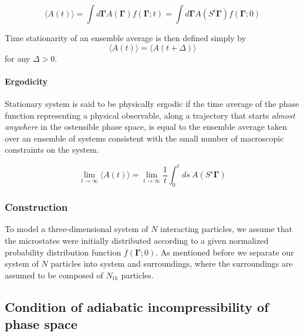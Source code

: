 \documentclass[a4paper,12pt,nofootinbib]{article}
\begin{document}
\begin{equation}
  \langle A(t) \rangle = \int d\bm{\Gamma} A(\bm{\Gamma}) f(\bm{\Gamma};t) = \int d\bm{\Gamma} A(S^t\bm{\Gamma})f(\bm{\Gamma};0)
\end{equation}

Time stationarity of an ensemble average is then defined simply by
\begin{equation}
\label{StationaryStateDef}
    \langle A(t) \rangle =   \langle A(t+\Delta) \rangle
\end{equation}
for any $\Delta > 0$.


\paragraph{Ergodicity}
Stationary system is said to be physically ergodic if the time average of the phase function representing a physical observable, along a trajectory that starts \textit{almost anywhere} in the ostensible phase space, is equal to the ensemble average taken over an ensemble of systems consistent with the small number of macroscopic constraints on the system.

\begin{equation}
    \lim_{t \to \infty} \langle A(t) \rangle = \lim_{t \to \infty} \frac{1}{t} \int_0^t ds\ A(S^s \bm{\Gamma})
\end{equation}

\subsubsection{Construction}

To model a three-dimensional system of $N$ interacting particles, we assume that the microstates were initially distributed according to a given normalized probability distribution function $f(\bm{\Gamma};0)$. As mentioned before we separate our system of $N$ particles into system and surroundings, where the surroundings are assumed to be composed of $N_{th}$ particles. 




\subsection{Condition of adiabatic incompressibility of phase space}
\end{document}
